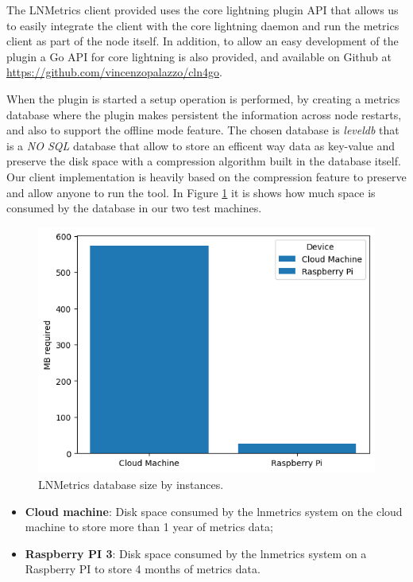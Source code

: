 The LNMetrics client provided uses the core lightning plugin API
that allows us to easily integrate the client with the core lightning daemon 
and run the metrics client as part of the node itself. 
In addition, to allow an easy development of the plugin a 
Go API for core lightning is also provided, and available on 
Github at \url{https://github.com/vincenzopalazzo/cln4go}.

When the plugin is started a setup operation is performed, by creating a 
metrics database where the plugin makes persistent the information 
across node restarts, and also to support the offline mode feature. 
The chosen database is \emph{leveldb} that is a \emph{NO SQL} database 
that allow to store an efficent way data as key-value and preserve
the disk space with a compression algorithm built in the database itself.
Our client implementation is heavily based on the 
compression feature to preserve and allow anyone to 
run the tool. 
In Figure \ref{fig:lnmetrics_diskspace} it is shows how much space is 
consumed by the database in our two test machines. 

\begin{figure}
    \begin{center}
    \includegraphics[scale=0.7]{imgs/disk_space_servers.png}
    \end{center}
    \caption{LNMetrics database size by instances.}
    \label{fig:lnmetrics_diskspace}
\end{figure}

\begin{itemize}
    \item {\bf Cloud machine}: Disk space consumed by the lnmetrics 
        system on the cloud machine to store more than 1 year of metrics data;
    \item {\bf Raspberry PI 3}: Disk space consumed by the lnmetrics system
        on a Raspberry PI to store 4 months of metrics data.
\end{itemize}

